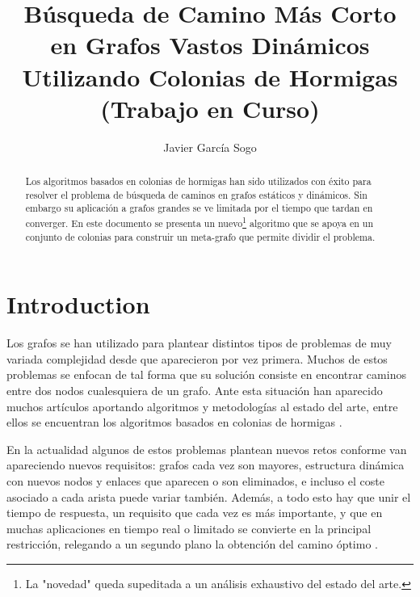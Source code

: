 \documentclass{llncs}
\begin{document}
%
\mainmatter              %
%
\title{B{\'u}squeda de Camino M{\'a}s Corto en Grafos Vastos Din{\'a}micos Utilizando Colonias de Hormigas (Trabajo en Curso)}
%
%
\author{Javier Garc{\'i}a Sogo}
%
%
%

\maketitle              %

\begin{abstract}
Los algoritmos basados en colonias de hormigas han sido utilizados con {\'e}xito para resolver el problema de b{\'u}squeda de caminos en grafos est{\'a}ticos y din{\'a}micos. Sin embargo su aplicaci{\'o}n a grafos grandes se ve limitada por el tiempo que tardan en converger.
En este documento se presenta un nuevo\footnote{La "novedad" queda supeditada a un an{\'a}lisis exhaustivo del estado del arte.} algoritmo que se apoya en un conjunto de colonias para construir un meta-grafo que permite dividir el problema.
\end{abstract}
%
\section{Introduction}
%
Los grafos se han utilizado para plantear distintos tipos de problemas de muy variada complejidad desde que aparecieron por vez primera.
Muchos de estos problemas se enfocan de tal forma que su soluci{\'o}n consiste en encontrar caminos entre dos nodos cualesquiera de un grafo. 
Ante esta situaci{\'o}n han aparecido muchos art{\'i}culos aportando algoritmos y metodolog{\'i}as al estado del arte, entre ellos se encuentran los algoritmos basados en colonias de hormigas \cite{Dorigo1992}.

En la actualidad algunos de estos problemas plantean nuevos retos conforme van apareciendo nuevos requisitos: grafos cada vez son mayores, estructura din{\'a}mica con nuevos nodos y enlaces que aparecen o son eliminados, e incluso el coste asociado a cada arista puede variar tambi{\'e}n.
Adem{\'a}s, a todo esto hay que unir el tiempo de respuesta, un requisito que cada vez es m{\'a}s importante, y que en muchas aplicaciones en tiempo real o limitado se convierte en la principal restricci{\'o}n, relegando a un segundo plano la obtenci{\'o}n del camino {\'o}ptimo \cite{Rivero2011}.
\end{document}

